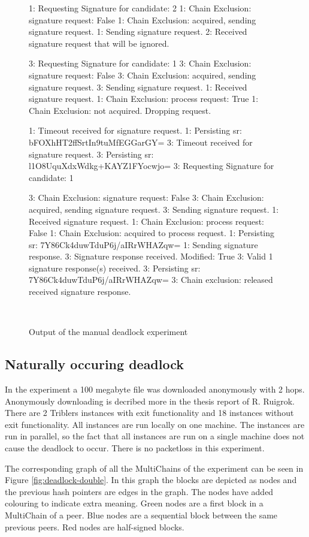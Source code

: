 \begin{figure}
\begin{FVerbatim}[fontsize=\small]
1: Requesting Signature for candidate: 2
1: Chain Exclusion: signature request: False
1: Chain Exclusion: acquired, sending signature request.
1: Sending signature request.
2: Received signature request that will be ignored.

3: Requesting Signature for candidate: 1
3: Chain Exclusion: signature request: False
3: Chain Exclusion: acquired, sending signature request.
3: Sending signature request.
1: Received signature request.
1: Chain Exclusion: process request: True
1: Chain Exclusion: not acquired. Dropping request.

1: Timeout received for signature request.
1: Persisting sr: bFOXhHT2ffSrtIn9tuMfEGGarGY=
3: Timeout received for signature request.
3: Persisting sr: l1O8UquXdxWdkg+KAYZ1FYocwjo=
3: Requesting Signature for candidate: 1

3: Chain Exclusion: signature request: False
3: Chain Exclusion: acquired, sending signature request.
3: Sending signature request.
1: Received signature request.
1: Chain Exclusion: process request: False
1: Chain Exclusion: acquired to process request.
1: Persisting sr: 7Y86Ck4duwTduP6j/aIRrWHAZqw=
1: Sending signature response.
3: Signature response received. Modified: True
3: Valid 1 signature response(s) received.
3: Persisting sr: 7Y86Ck4duwTduP6j/aIRrWHAZqw=
3: Chain exclusion: released received signature response.
\end{FVerbatim}
    \caption{Output of the manual deadlock experiment}~\label{fig:manual-deadlock-experiment}
\end{figure}

\subsection{Naturally occuring deadlock}
In the experiment a 100 megabyte file was downloaded anonymously with 2 hops.
Anonymously downloading is decribed more in the thesis report of R. Ruigrok\cite{ruigrok-anonymous}.
There are 2 Triblers instances with exit functionality and 18 instances without exit functionality.
All instances are run locally on one machine.
The instances are run in parallel,
so the fact that all instances are run on a single machine does not cause the deadlock to occur.
There is no packetloss in this experiment.

The corresponding graph of all the MultiChains of the experiment can be seen in Figure \ref{fig:deadlock-double}.
In this graph the blocks are depicted as nodes and the previous hash pointers are edges in the graph.
The nodes have added colouring to indicate extra meaning.
Green nodes are a first block in a MultiChain of a peer.
Blue nodes are a sequential block between the same previous peers.
Red nodes are half-signed blocks.

